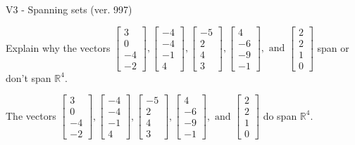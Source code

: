 \begin{exercise}
  \begin{exerciseTitle}V3 - Spanning sets (ver. 997)\end{exerciseTitle}
  \begin{exerciseStatement}
    Explain why the vectors \(\left[\begin{array}{r}
3 \\
0 \\
-4 \\
-2
\end{array}\right] , \left[\begin{array}{r}
-4 \\
-4 \\
-1 \\
4
\end{array}\right] , \left[\begin{array}{r}
-5 \\
2 \\
4 \\
3
\end{array}\right] , \left[\begin{array}{r}
4 \\
-6 \\
-9 \\
-1
\end{array}\right] , \text{ and } \left[\begin{array}{r}
2 \\
2 \\
1 \\
0
\end{array}\right]\) span or don't span \(\mathbb{R}^4\). 
	


  \end{exerciseStatement}
  \begin{exerciseAnswer}
   The vectors \(\left[\begin{array}{r}
3 \\
0 \\
-4 \\
-2
\end{array}\right] , \left[\begin{array}{r}
-4 \\
-4 \\
-1 \\
4
\end{array}\right] , \left[\begin{array}{r}
-5 \\
2 \\
4 \\
3
\end{array}\right] , \left[\begin{array}{r}
4 \\
-6 \\
-9 \\
-1
\end{array}\right] , \text{ and } \left[\begin{array}{r}
2 \\
2 \\
1 \\
0
\end{array}\right]\) 
  	 do  
	span \(\mathbb{R}^4\).
  



\end{exerciseAnswer}
\end{exercise}
